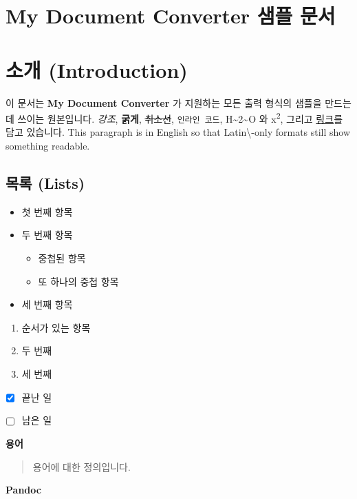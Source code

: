 \documentclass[11pt]{article}
\date{}
\begin{document}
\section*{My Document Converter 샘플 문서}\label{my-document-converter-샘플-문서}

\section*{소개 (Introduction)}\label{소개-introduction}

이 문서는 \textbf{My Document Converter} 가 지원하는 모든 출력 형식의 샘플을 만드는 데 쓰이는
원본입니다. \emph{강조}, \textbf{굵게}, \sout{취소선}, \verb|인라인 코드|,
H\textasciitilde{}2\textasciitilde{}O 와 x\textsuperscript{2}, 그리고
\href{https://example.com}{링크}를 담고 있습니다. This paragraph is in English so
that Latin\textbackslash{}-only formats still show something readable.

\subsection*{목록 (Lists)}\label{목록-lists}

\begin{itemize}
\item 첫 번째 항목
\item 두 번째 항목
\begin{itemize}
\item 중첩된 항목
\item 또 하나의 중첩 항목
\end{itemize}
\item 세 번째 항목
\end{itemize}

\begin{enumerate}
\item 순서가 있는 항목
\item 두 번째
\item 세 번째
\end{enumerate}

\begin{itemize}
\item ☒ 끝난 일
\item ☐ 남은 일
\end{itemize}

\textbf{용어}

\begin{quote}
용어에 대한 정의입니다.
\end{quote}

\textbf{Pandoc}
\end{document}
